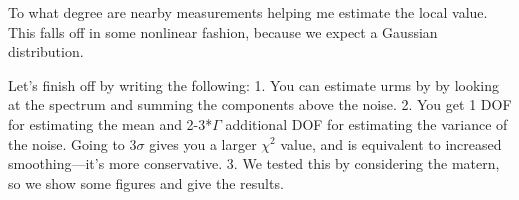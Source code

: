 \documentclass[twocol]{ametsoc}
\begin{document}
To what degree are nearby measurements helping me estimate the local value. This falls off in some nonlinear fashion, because we expect a Gaussian distribution.

Let's finish off by writing the following:
1. You can estimate urms by by looking at the spectrum and summing the components above the noise.
2. You get 1 DOF for estimating the mean and 2-3*$\Gamma$ additional DOF for estimating the variance of the noise. Going to $3 \sigma$ gives you a larger $\chi^2$ value, and is equivalent to increased smoothing---it's more conservative.
3. We tested this by considering the matern, so we show some figures and give the results.



%
%
%
%
%
%
\end{document}

